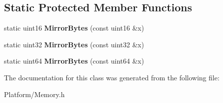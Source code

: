 \subsection*{Static Protected Member Functions}
\begin{DoxyCompactItemize}
\item 
\mbox{\label{class_gost_crypt_1_1_endian_ab9cb675d5298146ab83613f543f6e09e}} 
static uint16 {\bfseries Mirror\+Bytes} (const uint16 \&x)
\item 
\mbox{\label{class_gost_crypt_1_1_endian_a5ce08aff7142bbec87fc09749fd97a63}} 
static uint32 {\bfseries Mirror\+Bytes} (const uint32 \&x)
\item 
\mbox{\label{class_gost_crypt_1_1_endian_a049a7a1bbec15709108ef6213bced5f6}} 
static uint64 {\bfseries Mirror\+Bytes} (const uint64 \&x)
\end{DoxyCompactItemize}


The documentation for this class was generated from the following file\+:\begin{DoxyCompactItemize}
\item 
Platform/Memory.\+h\end{DoxyCompactItemize}
